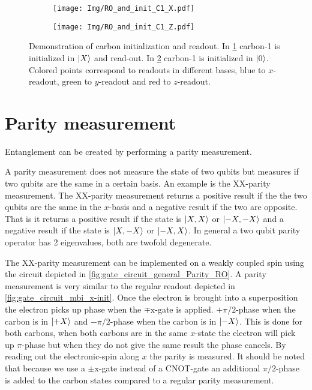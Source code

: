 \begin{figure}[htbp]
    \begin{subfigure}[t]{0.49\textwidth}\centering
        \caption{}
        \texttt{[image: Img/RO\_and\_init\_C1\_X.pdf]}
        \label{fig:carbon_init_x}
    \end{subfigure}
        \begin{subfigure}[t]{0.49\textwidth}\centering
        \caption{}
        \texttt{[image: Img/RO\_and\_init\_C1\_Z.pdf]}
        \label{fig:carbon_init_Z}
    \end{subfigure}
    \caption{Demonstration of carbon initialization and readout. In \cref{fig:carbon_init_x} carbon-1 is initialized in ${\left\vert{X}\right\rangle}$ and read-out. In \cref{fig:carbon_init_Z} carbon-1 is initialized in ${\left\vert{0}\right\rangle}$. Colored points correspond to readouts in different bases, blue to $x$-readout, green to $y$-readout and red to $z$-readout.}
    \label{fig:single_qubit_initialization}
\end{figure}


\section{Parity measurement}
Entanglement can be created by performing a parity measurement.

A parity measurement does not measure the state of two qubits but measures if  two qubits are the same in a certain basis.
An example is the XX-parity measurement.
The XX-parity measurement returns a positive result if the the two qubits are the same in the $x$-basis and a negative result if the two are opposite.
That is it returns a positive result if the state is ${\left\vert{X,X}\right\rangle}$ or ${\left\vert{-X,-X}\right\rangle}$ and a negative result if the state is ${\left\vert{X,-X}\right\rangle}$ or ${\left\vert{-X,X}\right\rangle}$.
In general a two qubit parity operator has 2 eigenvalues, both are twofold degenerate.

The XX-parity measurement can be implemented on a weakly coupled spin using the circuit depicted in \cref{fig:gate_circuit_general_Parity_RO}.
A parity measurement is very similar to the regular readout depicted in \cref{fig:gate_circuit_mbi_x-init}.
Once the electron is brought into a superposition the electron picks up phase when the $\mp \mathrm{x}$-gate is applied.
$+\pi/2$-phase when the carbon is in ${\left\vert{+X}\right\rangle}$ and $-\pi/2$-phase when the carbon is in ${\left\vert{-X}\right\rangle}$.
This is done for both carbons, when both carbons are in the same $x$-state the electron will pick up $\pi$-phase but when they do not give the same result the phase cancels.
By reading out the electronic-spin along $x$ the parity is measured.
It should be noted that because we use a $\pm \mathrm{x}$-gate instead of a CNOT-gate an additional $\pi/2$-phase is added to the carbon states compared to a regular parity measurement.

